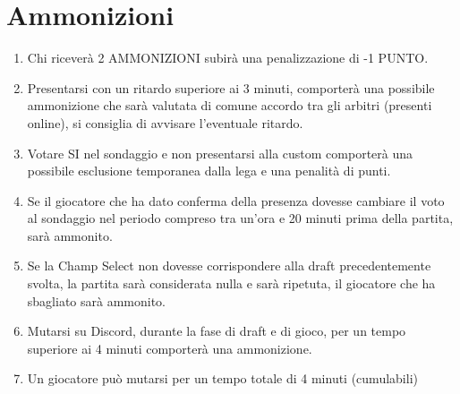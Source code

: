 \documentclass[a4paper, 12pt]{report}
\begin{document}
\section*{Ammonizioni}
\begin{enumerate}
  \item Chi riceverà 2 AMMONIZIONI subirà una penalizzazione di -1 PUNTO.
  \item Presentarsi con un ritardo superiore ai 3 minuti, comporterà una possibile ammonizione che sarà valutata di comune accordo tra gli arbitri (presenti online), si consiglia di avvisare l'eventuale ritardo.
  \item Votare SI nel sondaggio e non presentarsi alla custom comporterà una possibile esclusione temporanea dalla lega e una penalità di punti.
  \item Se il giocatore che ha dato conferma della presenza dovesse cambiare il voto al sondaggio nel periodo compreso tra un'ora e 20 minuti prima della partita, sarà ammonito.
  \item Se la Champ Select non dovesse corrispondere alla draft precedentemente svolta, la partita sarà considerata nulla e sarà ripetuta, il giocatore che ha sbagliato sarà ammonito.
  \item Mutarsi su Discord, durante la fase di draft e di gioco, per un tempo superiore ai 4 minuti comporterà una ammonizione.
  \item Un giocatore può mutarsi per un tempo totale di 4 minuti (cumulabili)
\end{enumerate}
\end{document}
